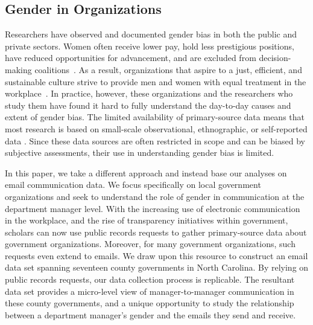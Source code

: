 \documentclass{pnastwo}
\begin{document}
\begin{article}


\section{Gender in Organizations}

Researchers have observed and documented gender bias in both the
public and private sectors. Women often receive lower pay, hold less
prestigious positions, have reduced opportunities for advancement, and
are excluded from decision-making coalitions~\citep{Brass1985,
  Bielby1986a, Ibarra1992, Albrecht2003, Duncan2004}. As a result,
organizations that aspire to a just, efficient, and sustainable
culture strive to provide men and women with equal treatment in the
workplace~\citep{Ely2000}. In practice, however, these organizations
and the researchers who study them have found it hard to fully
understand the day-to-day causes and extent of gender bias. The
limited availability of primary-source data means that most research
is based on small-scale observational, ethnographic, or self-reported
data \citep[e.g.,][]{Castilla2005, Adams2007, Elsesser2011}. Since
these data sources are often restricted in scope and can be biased by
subjective assessments, their use in understanding gender bias is
limited.

In this paper, we take a different approach and instead base our
analyses on email communication data. We focus specifically on local
government organizations and seek to understand the role of gender in
communication at the department manager level. With the increasing use
of electronic communication in the workplace, and the rise of
transparency initiatives within government, scholars can now use
public records requests to gather primary-source data about government
organizations. Moreover, for many government organizations, such
requests even extend to emails. We draw upon this resource to
construct an email data set spanning seventeen county governments in
North Carolina. By relying on public records requests, our data
collection process is replicable. The resultant data set provides a
micro-level view of manager-to-manager communication in these county
governments, and a unique opportunity to study the relationship
between a department manager's gender and the emails they send and
receive.


\end{article}
\end{document}
